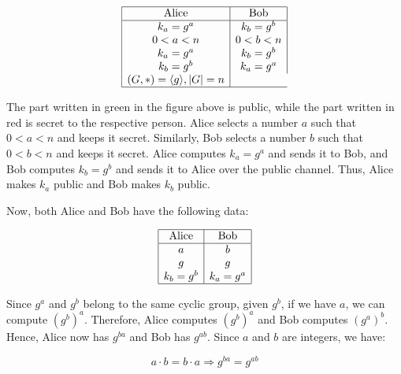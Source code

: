 \documentclass[11pt]{article}
\begin{document}
\[
\begin{array}{|c|c|}
\hline
\text{Alice} & \text{Bob} \\
\hline
k_a = g^a & k_b = g^b \\
0 < a < n & 0 < b < n \\
k_a = g^a & k_b = g^b \\
k_b = g^b & k_a = g^a \\
(G, *) = \langle g \rangle, |G| = n \\
\hline
\end{array}
\]

The part written in green in the figure above is public, while the part written in red is secret to the respective person. Alice selects a number \( a \) such that \( 0 < a < n \) and keeps it secret. Similarly, Bob selects a number \( b \) such that \( 0 < b < n \) and keeps it secret. Alice computes \( k_a = g^a \) and sends it to Bob, and Bob computes \( k_b = g^b \) and sends it to Alice over the public channel. Thus, Alice makes \( k_a \) public and Bob makes \( k_b \) public.

Now, both Alice and Bob have the following data:

\[
\begin{array}{|c|c|}
\hline
\text{Alice} & \text{Bob} \\
\hline
a & b \\
g & g \\
k_b = g^b & k_a = g^a \\
\hline
\end{array}
\]

Since \( g^a \) and \( g^b \) belong to the same cyclic group, given \( g^b \), if we have \( a \), we can compute \( (g^b)^a \). Therefore, Alice computes \( (g^b)^a \) and Bob computes \( (g^a)^b \). Hence, Alice now has \( g^{ba} \) and Bob has \( g^{ab} \). Since \( a \) and \( b \) are integers, we have:

\[ a \cdot b = b \cdot a \Rightarrow g^{ba} = g^{ab} \]
\end{document}
